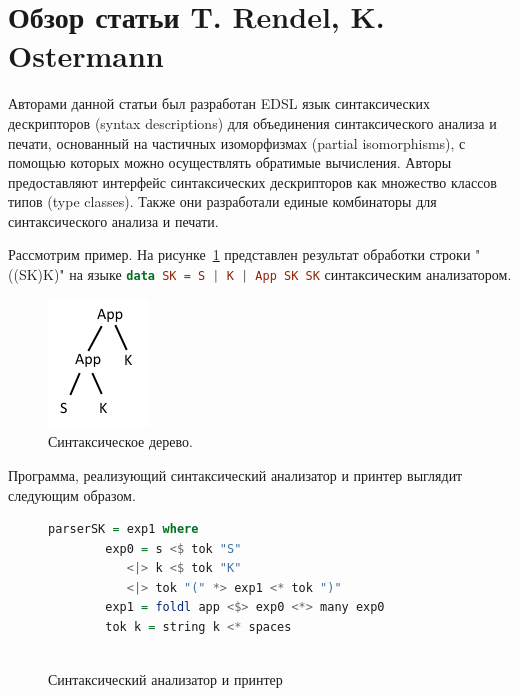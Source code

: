 \documentclass{matmex-diploma-custom}
\begin{document}
\section{Обзор статьи T. Rendel, K. Ostermann
}

Авторами данной статьи был разработан EDSL язык синтаксических дескрипторов (syntax descriptions) для объединения синтаксического анализа и печати, основанный на частичных изоморфизмах (partial isomorphisms), с помощью которых можно осуществлять обратимые вычисления. Авторы предоставляют интерфейс синтаксических дескрипторов как множество классов типов (type classes). Также они разработали единые комбинаторы для синтаксического анализа и печати.

Рассмотрим пример. На рисунке~\ref{AST} представлен результат обработки строки "((SK)K)" на языке \lstinline[language=haskell,mathescape]{data SK = S | K | App SK SK} синтаксическим анализатором.
\begin{figure}[h]
  \centering
    \includegraphics[scale = 0.9]{AST.png}
    \caption{Синтаксическое дерево.}
    \label{AST}
 \end{figure}

Программа, реализующий синтаксический анализатор и принтер выглядит следующим образом.

\begin{figure}[h]
\label{разрыв_функции}
\centering

\begin{lstlisting}[language = Haskell]
    parserSK = exp1 where
        exp0 = s <$ tok "S"
           <|> k <$ tok "K" 
           <|> tok "(" *> exp1 <* tok ")"
        exp1 = foldl app <$> exp0 <*> many exp0
        tok k = string k <* spaces
    
\end{lstlisting}

\caption{Синтаксический анализатор и принтер}
\end{figure}

\end{document}

